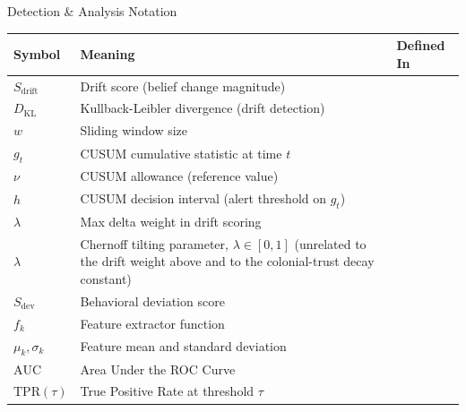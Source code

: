 \documentclass[
  ignorenonframetext,
]{beamer}
\newcounter{none} %
\providecommand{\cref}[1]{\texttt{\detokenize{#1}}}
\begin{document}
\begin{frame}[allowframebreaks]{Detection \& Analysis Notation}
{\def\LTcaptype{none} %
\begin{longtable}[]{@{}
  >{\raggedright\arraybackslash}p{}
  >{\raggedright\arraybackslash}p{}
  >{\raggedright\arraybackslash}p{}@{}}
\toprule\noalign{}
\begin{minipage}[b]{\linewidth}\raggedright
Symbol
\end{minipage} & \begin{minipage}[b]{\linewidth}\raggedright
Meaning
\end{minipage} & \begin{minipage}[b]{\linewidth}\raggedright
Defined In
\end{minipage} \\
\midrule\noalign{}
\endhead
\(S_{\text{drift}}\) & Drift score (belief change magnitude) &
\cref{def:drift-score} \\
\(D_{\text{KL}}\) & Kullback-Leibler divergence (drift detection) &
\cref{def:drift-detection} \\
\(w\) & Sliding window size & \cref{def:drift-detection} \\
\(g_t\) & CUSUM cumulative statistic at time \(t\) &
\cref{def:cusum-detector} \\
\(\nu\) & CUSUM allowance (reference value) &
\cref{def:cusum-detector} \\
\(h\) & CUSUM decision interval (alert threshold on \(g_t\)) &
\cref{def:cusum-detector} \\
\(\lambda\) & Max delta weight in drift scoring &
\cref{eq:drift-score} \\
\(\lambda\) & Chernoff tilting parameter, \(\lambda \in [0,1]\)
(unrelated to the drift weight above and to the colonial-trust decay
constant) & \cref{eq:chernoff} \\
\(S_{\text{dev}}\) & Behavioral deviation score &
\cref{def:deviation-score} \\
\(f_k\) & Feature extractor function & \cref{eq:deviation-score} \\
\(\mu_k, \sigma_k\) & Feature mean and standard deviation &
\cref{eq:deviation-score} \\
\(\text{AUC}\) & Area Under the ROC Curve & \cref{def:auc} \\
\(\text{TPR}(\tau)\) & True Positive Rate at threshold \(\tau\) &
\cref{eq:tpr} \\

\end{longtable}}
\end{frame}
\end{document}
